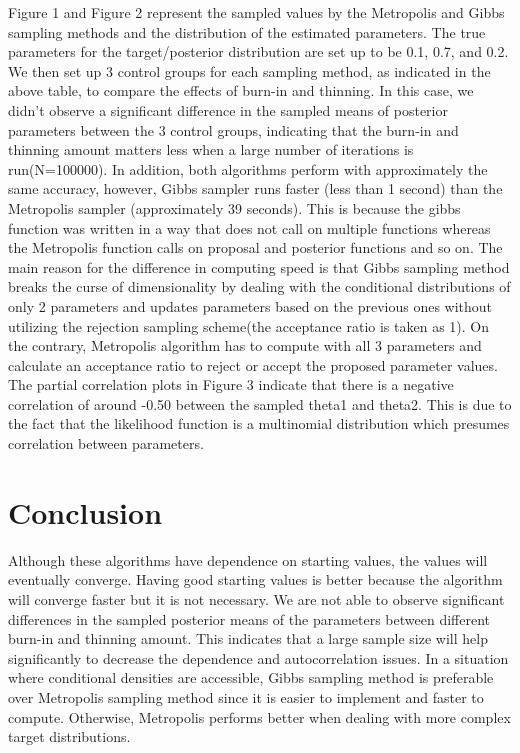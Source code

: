 \documentclass[11pt,a4paper]{article}
\begin{document}
Figure 1 and Figure 2 represent the sampled values by the Metropolis and Gibbs sampling methods and the distribution of the estimated parameters. The true parameters for the target/posterior distribution are set up to be 0.1, 0.7, and 0.2. We then set up 3 control groups for each sampling method, as indicated in the above table, to compare the effects of burn-in and thinning. In this case, we didn’t observe a significant difference in the sampled means of posterior parameters between the 3 control groups, indicating that the burn-in and thinning amount matters less when a large number of iterations is run(N=100000). In addition, both algorithms perform with approximately the same accuracy, however, Gibbs sampler runs faster (less than 1 second) than the Metropolis sampler (approximately 39 seconds). This is because the gibbs function was written in a way that does not call on multiple functions whereas the Metropolis function calls on proposal and posterior functions and so on. The main reason for the difference in computing speed is that Gibbs sampling method breaks the curse of dimensionality by dealing with the conditional distributions of only 2 parameters and updates parameters based on the previous ones without utilizing the rejection sampling scheme(the acceptance ratio is taken as 1). On the contrary, Metropolis algorithm has to compute with all 3 parameters and calculate an acceptance ratio to reject or accept the proposed parameter values. \\

The partial correlation plots in Figure 3 indicate that there is a negative correlation of around -0.50 between the sampled theta1 and theta2. This is due to the fact that the likelihood function is a multinomial distribution which presumes correlation between parameters. 




\section*{Conclusion}
Although these algorithms have dependence on starting values, the values will eventually converge. Having good starting values is better because the algorithm will converge faster but it is not necessary. We are not able to observe significant differences in the sampled posterior means of the parameters between different burn-in and thinning amount. This indicates that a large sample size will help significantly to decrease the dependence and autocorrelation issues. In a situation where conditional densities are accessible, Gibbs sampling method is preferable over Metropolis sampling method since it is easier to implement and faster to compute. Otherwise, Metropolis performs better when dealing with more complex target distributions. 
	
\end{document}
